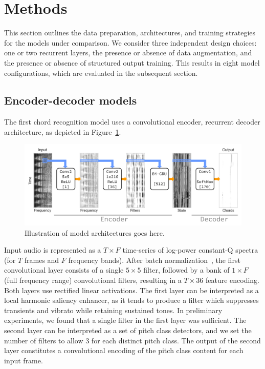 \documentclass{article}
\begin{document}
\cite{mauchsimple}

\section{Methods}






This section outlines the data preparation, architectures, and training strategies for the models under comparison.
We consider three independent design choices: one or two recurrent layers, the presence or absence of data augmentation, and the presence or absence of structured output training.
This results in eight model configurations, which are evaluated in the subsequent section.

\subsection{Encoder-decoder models}


The first chord recognition model uses a convolutional encoder, recurrent decoder architecture, as depicted in Figure~\ref{fig:model}. %
\begin{figure}
    \centering
    \includegraphics[width=0.95\columnwidth]{crnn1}
    \caption{Illustration of model architectures goes here.\label{fig:model}}
\end{figure}
Input audio is represented as a $T\times F$ time-series of log-power constant-Q spectra (for $T$ frames and $F$ frequency bands).
After batch normalization~\cite{ioffe2015batch}, the first convolutional layer consists of a single $5\times5$ filter, followed by a bank of $1\times F$ (full frequency range) convolutional filters, resulting in a $T\times 36$ feature encoding.
Both layers use rectified linear activations.
The first layer can be interpreted as a local harmonic saliency enhancer, as it tends to produce a filter which suppresses transients and vibrato while retaining sustained tones.
In preliminary experiments, we found that a single filter in the first layer was sufficient.
The second layer can be interpreted as a set of pitch class detectors, and we set the number of filters to allow 3 for each distinct pitch class.
The output of the second layer constitutes a convolutional encoding of the pitch class content for each input frame.
\end{document}

